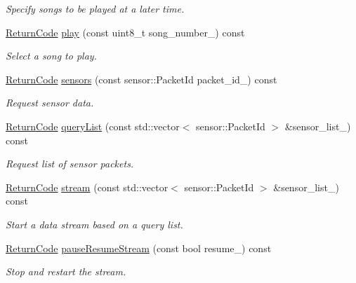 \begin{DoxyCompactItemize}
\begin{DoxyCompactList}\small\item\em Specify songs to be played at a later time. \end{DoxyCompactList}\item 
\hyperlink{classroomba_1_1series500_1_1_open_interface_a43fc2ae1216e57cfb46901331b9ab4c7}{Return\+Code} \hyperlink{classroomba_1_1series500_1_1_open_interface_a45a0be479446315917583b5f58108952}{play} (const uint8\+\_\+t song\+\_\+number\+\_\+) const 
\begin{DoxyCompactList}\small\item\em Select a song to play. \end{DoxyCompactList}\item 
\hyperlink{classroomba_1_1series500_1_1_open_interface_a43fc2ae1216e57cfb46901331b9ab4c7}{Return\+Code} \hyperlink{classroomba_1_1series500_1_1_open_interface_a60b670d97a0f3ab5695529a00b81c73f}{sensors} (const sensor\+::\+Packet\+Id packet\+\_\+id\+\_\+) const 
\begin{DoxyCompactList}\small\item\em Request sensor data. \end{DoxyCompactList}\item 
\hyperlink{classroomba_1_1series500_1_1_open_interface_a43fc2ae1216e57cfb46901331b9ab4c7}{Return\+Code} \hyperlink{classroomba_1_1series500_1_1_open_interface_aeb6ba5e140e821bb0cf1c9dd70465fc0}{query\+List} (const std\+::vector$<$ sensor\+::\+Packet\+Id $>$ \&sensor\+\_\+list\+\_\+) const 
\begin{DoxyCompactList}\small\item\em Request list of sensor packets. \end{DoxyCompactList}\item 
\hyperlink{classroomba_1_1series500_1_1_open_interface_a43fc2ae1216e57cfb46901331b9ab4c7}{Return\+Code} \hyperlink{classroomba_1_1series500_1_1_open_interface_a990642768282c49110d83da52a4f8e6f}{stream} (const std\+::vector$<$ sensor\+::\+Packet\+Id $>$ \&sensor\+\_\+list\+\_\+) const 
\begin{DoxyCompactList}\small\item\em Start a data stream based on a query list. \end{DoxyCompactList}\item 
\hyperlink{classroomba_1_1series500_1_1_open_interface_a43fc2ae1216e57cfb46901331b9ab4c7}{Return\+Code} \hyperlink{classroomba_1_1series500_1_1_open_interface_adc45affe626cbf44e50c26b472cd8c00}{pause\+Resume\+Stream} (const bool resume\+\_\+) const 
\begin{DoxyCompactList}\small\item\em Stop and restart the stream. \end{DoxyCompactList}\end{DoxyCompactItemize}
